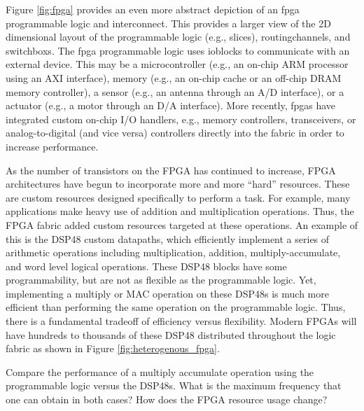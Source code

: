 Figure \ref{fig:fpga} provides an even more abstract depiction of an \gls{fpga} programmable logic and interconnect. This provides a larger view of the 2D dimensional layout of the programmable logic (e.g., \glspl{slice}), \glspl{routingchannel}, and \glspl{switchbox}. The \gls{fpga} programmable logic uses \glspl{ioblock} to communicate with an external device. This may be a microcontroller (e.g., an on-chip ARM processor using an AXI interface), memory (e.g., an on-chip cache or an off-chip DRAM memory controller), a sensor (e.g., an antenna through an A/D interface), or a actuator (e.g., a motor through an D/A interface). More recently, \glspl{fpga} have integrated custom on-chip I/O handlers, e.g., memory controllers, transceivers, or analog-to-digital (and vice versa) controllers directly into the fabric in order to increase performance.

As the number of transistors on the FPGA has continued to increase, FPGA architectures have begun to incorporate more and more ``hard'' resources. These are custom resources designed specifically to perform a task. For example, many applications make heavy use of addition and multiplication operations. Thus, the FPGA fabric added custom resources targeted at these operations. An example of this is the DSP48 custom datapaths, which efficiently implement a series of arithmetic operations including multiplication, addition, multiply-accumulate, and word level logical operations. These DSP48 blocks have some programmability, but are not as flexible as the programmable logic. Yet, implementing a multiply or MAC operation on these DSP48s is much more efficient than performing the same operation on the programmable logic. Thus, there is a fundamental tradeoff of efficiency versus flexibility. Modern FPGAs will have hundreds to thousands of these DSP48 distributed throughout the logic fabric as shown in Figure \ref{fig:heterogenous_fpga}.

\begin{exercise}
Compare the performance of a multiply accumulate operation using the programmable logic versus the DSP48s. What is the maximum frequency that one can obtain in both cases? How does the FPGA resource usage change?
\end{exercise} 

